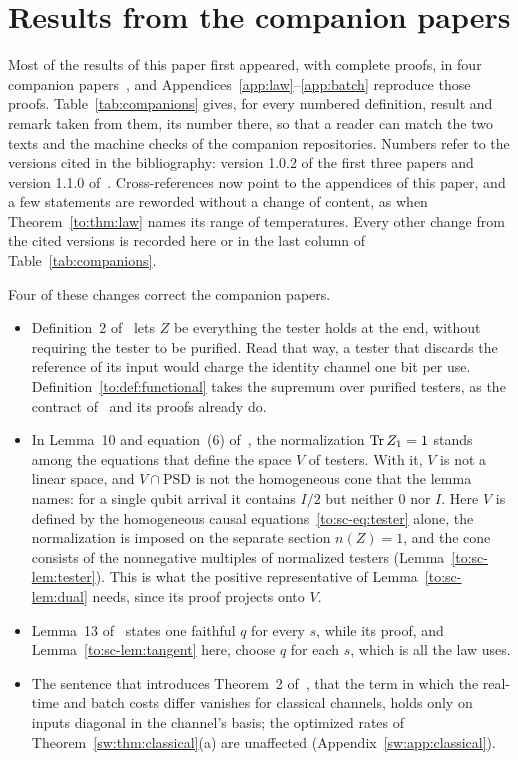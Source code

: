 \section{Results from the companion papers}\label{app:companions}

Most of the results of this paper first appeared, with complete proofs, in four companion papers~\cite{Order,SaveWork,Answering,KeepingTime}, and Appendices~\ref{app:law}--\ref{app:batch} reproduce those proofs. Table~\ref{tab:companions} gives, for every numbered definition, result and remark taken from them, its number there, so that a reader can match the two texts and the machine checks of the companion repositories. Numbers refer to the versions cited in the bibliography: version 1.0.2 of the first three papers and version 1.1.0 of~\cite{KeepingTime}. Cross-references now point to the appendices of this paper, and a few statements are reworded without a change of content, as when Theorem~\ref{to:thm:law} names its range of temperatures. Every other change from the cited versions is recorded here or in the last column of Table~\ref{tab:companions}.

Four of these changes correct the companion papers.
\begin{itemize}[leftmargin=*]
\item Definition~2 of~\cite{Order} lets $Z$ be everything the tester holds at the end, without requiring the tester to be purified. Read that way, a tester that discards the reference of its input would charge the identity channel one bit per use. Definition~\ref{to:def:functional} takes the supremum over purified testers, as the contract of~\cite[App.~B.1]{Order} and its proofs already do.
\item In Lemma~10 and equation~(6) of~\cite{Order}, the normalization $\operatorname{Tr} Z_1=1$ stands among the equations that define the space $V$ of testers. With it, $V$ is not a linear space, and $V\cap\mathrm{PSD}$ is not the homogeneous cone that the lemma names: for a single qubit arrival it contains $I/2$ but neither $0$ nor $I$. Here $V$ is defined by the homogeneous causal equations~\eqref{to:sc-eq:tester} alone, the normalization is imposed on the separate section $n(Z)=1$, and the cone consists of the nonnegative multiples of normalized testers (Lemma~\ref{to:sc-lem:tester}). This is what the positive representative of Lemma~\ref{to:sc-lem:dual} needs, since its proof projects onto $V$.
\item Lemma~13 of~\cite{Order} states one faithful $q$ for every $s$, while its proof, and Lemma~\ref{to:sc-lem:tangent} here, choose $q$ for each $s$, which is all the law uses.
\item The sentence that introduces Theorem~2 of~\cite{SaveWork}, that the term in which the real-time and batch costs differ vanishes for classical channels, holds only on inputs diagonal in the channel's basis; the optimized rates of Theorem~\ref{sw:thm:classical}(a) are unaffected (Appendix~\ref{sw:app:classical}).
\end{itemize}

